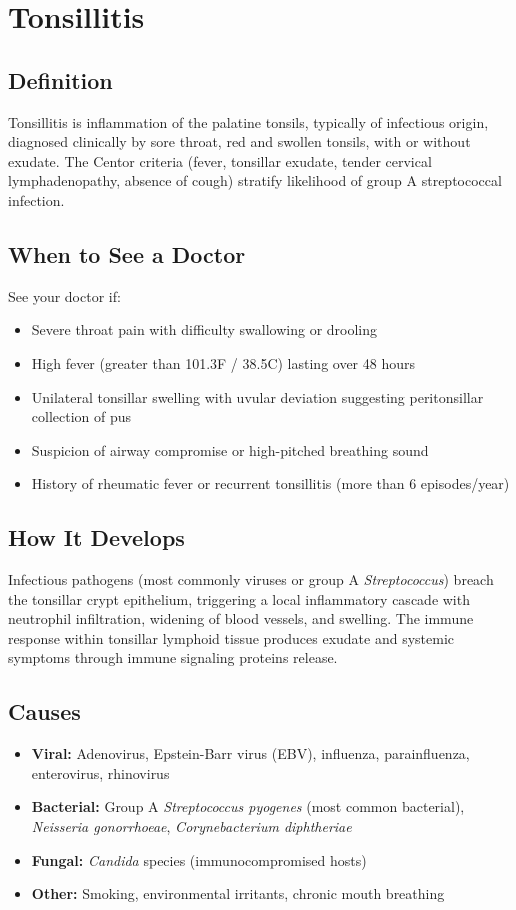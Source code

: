 \chapter{Tonsillitis}

\section*{Definition}
Tonsillitis is inflammation of the palatine tonsils, typically of infectious origin, diagnosed clinically by sore throat, red and swollen tonsils, with or without exudate. The Centor criteria (fever, tonsillar exudate, tender cervical lymphadenopathy, absence of cough) stratify likelihood of group A streptococcal infection.

\section*{When to See a Doctor}
See your doctor if:
\begin{itemize}
  \item Severe throat pain with difficulty swallowing or drooling
  \item High fever (greater than 101.3\textdegree{}F / 38.5\textdegree{}C) lasting over 48 hours
  \item Unilateral tonsillar swelling with uvular deviation suggesting peritonsillar collection of pus
  \item Suspicion of airway compromise or high-pitched breathing sound
  \item History of rheumatic fever or recurrent tonsillitis (more than 6 episodes/year)
\end{itemize}

\section*{How It Develops}
Infectious pathogens (most commonly viruses or group A \textit{Streptococcus}) breach the tonsillar crypt epithelium, triggering a local inflammatory cascade with neutrophil infiltration, widening of blood vessels, and swelling. The immune response within tonsillar lymphoid tissue produces exudate and systemic symptoms through immune signaling proteins release.

\section*{Causes}
\begin{itemize}
  \item \textbf{Viral:} Adenovirus, Epstein-Barr virus (EBV), influenza, parainfluenza, enterovirus, rhinovirus
  \item \textbf{Bacterial:} Group A \textit{Streptococcus pyogenes} (most common bacterial), \textit{Neisseria gonorrhoeae}, \textit{Corynebacterium diphtheriae}
  \item \textbf{Fungal:} \textit{Candida} species (immunocompromised hosts)
  \item \textbf{Other:} Smoking, environmental irritants, chronic mouth breathing
\end{itemize}

